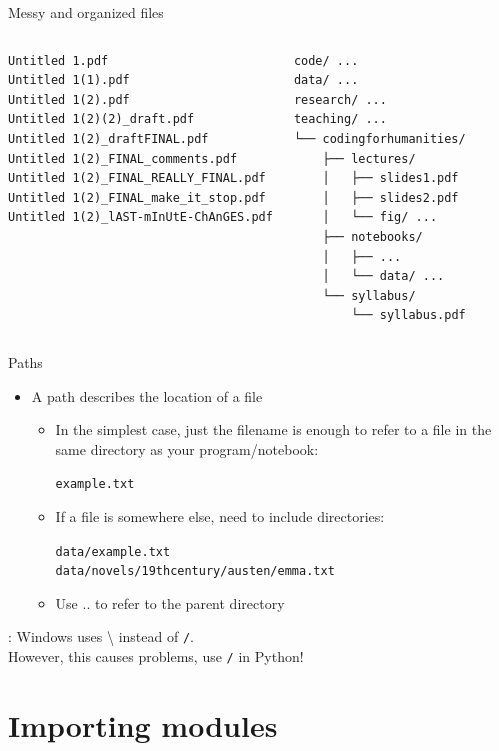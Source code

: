\documentclass[aspectratio=169,usenames,dvipsnames]{beamer}
\begin{document}
\begin{frame}[fragile]{Messy and organized files}
\begin{columns}
\begin{verbatim}
Untitled 1.pdf
Untitled 1(1).pdf
Untitled 1(2).pdf
Untitled 1(2)(2)_draft.pdf
Untitled 1(2)_draftFINAL.pdf
Untitled 1(2)_FINAL_comments.pdf
Untitled 1(2)_FINAL_REALLY_FINAL.pdf
Untitled 1(2)_FINAL_make_it_stop.pdf
Untitled 1(2)_lAST-mInUtE-ChAnGES.pdf
\end{verbatim}
\pause
{}
\begin{verbatim}
code/ ...
data/ ...
research/ ...
teaching/ ...
└── codingforhumanities/
    ├── lectures/
    │   ├── slides1.pdf
    │   ├── slides2.pdf
    │   └── fig/ ...
    ├── notebooks/
    │   ├── ...
    │   └── data/ ...
    └── syllabus/
        └── syllabus.pdf
\end{verbatim}
\end{columns}
\end{frame}

\begin{frame}{Paths}
    \begin{itemize}
        \item A path describes the location of a file
		\begin{itemize}
        \item In the simplest case, just the filename is enough to
            refer to a file in the same directory as your program/notebook:

            \texttt{example.txt}

        \item If a file is somewhere else, need to include directories:

            \texttt{data/example.txt}\\
            \texttt{data/novels/19thcentury/austen/emma.txt}
		\item Use .. to refer to the parent directory
		\end{itemize}
    \end{itemize}
    : Windows uses \textbackslash{} instead of \texttt{/}. \\
        However, this causes problems, use \texttt{/} in Python!
\end{frame}


\section{Importing modules}
\frame{\tableofcontents[currentsection]}
\end{document}
